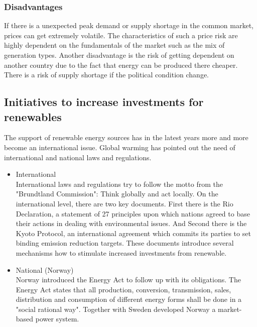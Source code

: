 \documentclass{article}
\begin{document}
\subsubsection{Disadvantages}
If there is a unexpected peak demand or supply shortage in the common market, prices can get extremely volatile. The characteristics of such a price risk are highly dependent on the fundamentals of the market such as the mix of generation types. Another disadvantage is the risk of getting dependent on another country due to the fact that energy can be produced there cheaper. There is a risk of supply shortage if the political condition change.
\subsection{Initiatives to increase investments for renewables}
The support of renewable energy sources has in the latest years more and more become an international issue. Global warming has pointed out the need of international and national laws and regulations.
\begin{itemize}
\item International\\
International laws and regulations try to follow the motto from the "Brundtland Commission": Think globally and act locally.  On the international level, there are two key documents. First there is the Rio Declaration, a statement of 27 principles upon which nations agreed to base their actions in dealing with environmental issues. And Second there is the Kyoto Protocol, an international agreement which commits its parties to set binding emission reduction targets. These documents introduce several mechanisms how to stimulate increased investments from renewable.
\item National (Norway)\\
Norway introduced the Energy Act to follow up with its obligations. The Energy Act states that all production, conversion, transmission, sales, distribution and consumption of different energy forms shall be done in a "social rational way". Together with Sweden developed Norway a market-based power system.
\end{itemize}
\end{document}
